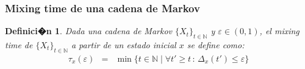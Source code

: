 \documentclass{beamer}
\newtheorem{definicion}{Definici�n}
\newcommand{\vs}[1]{\vspace{#1mm}}
\begin{document}
	\begin{frame}
		\frametitle{Mixing time de una cadena de Markov}
		
		{\small
			
			\begin{definicion}
				Dada una cadena  de Markov $\{ X_t \}_{t \in \mathbb{N}}$ y $\varepsilon \in (0,1)$, el mixing time de $\{ X_t \}_{t \in \mathbb{N}}$ a partir de un estado inicial $x$ se define como:
				\begin{eqnarray*}
					\tau_x(\varepsilon) & = & \min\{t \in \mathbb{N} \mid \forall t' \geq t \,:\, \Delta_x(t') \leq \varepsilon\}
				\end{eqnarray*}
			\end{definicion}
			
			\vs{8}
			
			
		}
		
	\end{frame}
	
\end{document}
